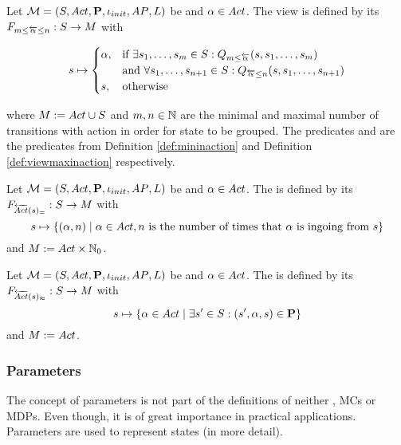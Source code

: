 \documentclass[preview]{standalone}
\begin{document}
\begin{definition}
	Let $\chgph = \chgphtuple$ be \chosengraphtypeN and $\action \in \actions$. The view 
	\viewspaninaction is defined by its \grpfctN $\gfctspaninaction : \states \to \arbset$ with
	
	\[
	\state \mapsto
	\begin{cases}
		\action,				& \text{if } \exists \state_1, \dots, \state_\numinactb \in \states: \predmininact[\numinactb] \\ &\text{and } \forall \state_1, \dots, \state_{\numinact+1} \in \states: \predmaxinact \\
		\remelem,          	& \text{otherwise}
	\end{cases}
	\]
	
	where $\imggrp := \actions \cup \remset$ and $\numinactb, \numinact \in \natnums$ are the minimal and maximal number of transitions with action \action in order for state to be grouped. The predicates \predmininact and \predmaxinact are the predicates from Definition \ref{def:mininaction} and Definition \ref{def:viewmaxinaction} respectively.
\end{definition}

\begin{definition}
	Let $\chgph = \chgphtuple$ be \chosengraphtypeN and $\action \in \actions$. The \viewN \viewstronginactident is defined by its \grpfctN $\gfctstronginactident : \states \to \imggrp$ with
	\[
	\state \mapsto	
	\{(\action, \numinact) \mid \action \in \actions, \numinact \text{ is the number of times that \action is ingoing from } \state\}
	\]
	and $\imggrp := \actions \times \natnums_0$.
\end{definition}

\begin{definition}
	Let $\chgph = \chgphtuple$ be \chosengraphtypeN and $\action \in \actions$. The \viewN \viewweakinactident is defined by its \grpfctN $\gfctweakinactident : \states \to \imggrp$ with
	\[
	\state \mapsto \{\action \in \actions \mid \exists \state' \in \states : (\state', \action, \state) \in \trans\} 	
	\]
	and $\imggrp := \actions$.
\end{definition}

\subsubsection{Parameters}
The concept of parameters is not part of the definitions of neither \chosengraphtypesN, MCs or MDPs. Even though, it is of great importance in practical applications. Parameters are used to represent states (in more detail). 
\end{document}
